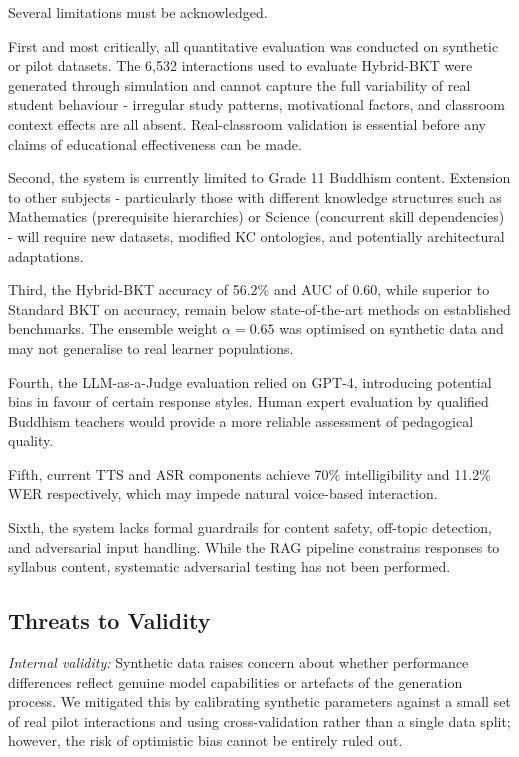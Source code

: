 \documentclass[conference]{IEEEtran}
\begin{document}
Several limitations must be acknowledged.

First and most critically, all quantitative evaluation was conducted on synthetic or pilot datasets. The 6,532 interactions used to evaluate Hybrid-BKT were generated through simulation and cannot capture the full variability of real student behaviour - irregular study patterns, motivational factors, and classroom context effects are all absent. Real-classroom validation is essential before any claims of educational effectiveness can be made.

Second, the system is currently limited to Grade 11 Buddhism content. Extension to other subjects - particularly those with different knowledge structures such as Mathematics (prerequisite hierarchies) or Science (concurrent skill dependencies) - will require new datasets, modified KC ontologies, and potentially architectural adaptations.

Third, the Hybrid-BKT accuracy of 56.2\% and AUC of 0.60, while superior to Standard BKT on accuracy, remain below state-of-the-art methods on established benchmarks. The ensemble weight $\alpha = 0.65$ was optimised on synthetic data and may not generalise to real learner populations.

Fourth, the LLM-as-a-Judge evaluation relied on GPT-4, introducing potential bias in favour of certain response styles. Human expert evaluation by qualified Buddhism teachers would provide a more reliable assessment of pedagogical quality.

Fifth, current TTS and ASR components achieve 70\% intelligibility and 11.2\% WER respectively, which may impede natural voice-based interaction.

Sixth, the system lacks formal guardrails for content safety, off-topic detection, and adversarial input handling. While the RAG pipeline constrains responses to syllabus content, systematic adversarial testing has not been performed.

\subsection{Threats to Validity}

\textit{Internal validity:} Synthetic data raises concern about whether performance differences reflect genuine model capabilities or artefacts of the generation process. We mitigated this by calibrating synthetic parameters against a small set of real pilot interactions and using cross-validation rather than a single data split; however, the risk of optimistic bias cannot be entirely ruled out.
\end{document}
